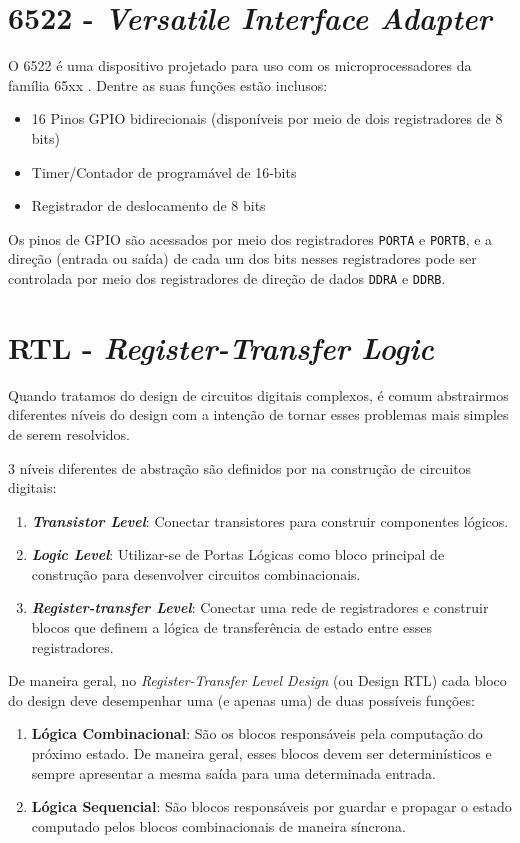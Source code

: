 \documentclass[
	12pt,				  %
	openright,		%
	a4paper,			%
	english,			%
	french,				%
	spanish,			%
	brazil,				%
]{abntex2}
\newcommand{\code}[1]{\colorbox{light-gray}{\texttt{#1}}}
\begin{document}
\section{6522 - \emph{Versatile Interface Adapter}}
O 6522 é uma dispositivo projetado para uso com os microprocessadores da família 65xx \cite{w65c22Datasheet}.
Dentre as suas funções estão inclusos:
\begin{itemize}
	\item 16 Pinos GPIO bidirecionais (disponíveis por meio de dois registradores de 8 bits)
	\item Timer/Contador de programável de 16-bits
	\item Registrador de deslocamento de 8 bits
\end{itemize}
Os pinos de GPIO são acessados por meio dos registradores \code{PORTA} e \code{PORTB}, e a direção (entrada ou saída)
de cada um dos bits nesses registradores pode ser controlada por meio dos registradores de direção de dados \code{DDRA} e \code{DDRB}.

\section{RTL - \emph{Register-Transfer Logic}}
Quando tratamos do design de circuitos digitais complexos, é comum abstrairmos
diferentes níveis do design com a intenção de tornar esses problemas mais
simples de serem resolvidos.

3 níveis diferentes de abstração são definidos por  na
construção de circuitos digitais:
\begin{enumerate}
	\item \textbf{\emph{Transistor Level}}: Conectar transistores para construir
	      componentes lógicos.
	\item \textbf{\emph{Logic Level}}: Utilizar-se de Portas Lógicas como bloco
	      principal de construção para desenvolver circuitos combinacionais.
	\item \textbf{\emph{Register-transfer Level}}: Conectar uma rede de
	      registradores e construir blocos que definem a lógica de transferência
	      de estado entre esses registradores.
\end{enumerate}

De maneira geral, no \emph{Register-Transfer Level Design} (ou Design RTL) cada
bloco do design deve desempenhar uma (e apenas uma) de duas possíveis funções:
\begin{enumerate}
	\item \textbf{Lógica Combinacional}: São os blocos responsáveis pela
	      computação do próximo estado. De maneira geral, esses blocos devem ser
	      determinísticos e sempre apresentar a mesma saída para uma determinada
	      entrada.
	\item \textbf{Lógica Sequencial}: São blocos responsáveis por guardar e
	      propagar o estado computado pelos blocos combinacionais de maneira
	      síncrona.
\end{enumerate}
\end{document}
